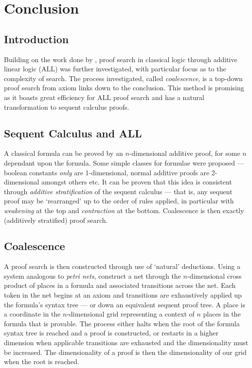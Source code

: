 \chapter{Conclusion}
    
        
    \section*{Introduction}
        Building on the work done by \citet{petri-nets}, proof search in classical logic through additive linear logic (ALL) was further investigated, with particular focus as to the complexity of search.
        The process investigated, called \textit{coalescence}, is a top-down proof search from axiom links down to the conclusion.
        This method is promising as it boasts great efficiency for ALL proof search and has a natural transformation to sequent calculus proofs.

    \section*{Sequent Calculus and ALL}
        A classical formula can be proved by an $n$-dimensional additive proof, for some $n$ dependant upon the formula.
        Some simple classes for formulae were proposed --- boolean constants \textit{only} are 1-dimensional, normal additive proofs are 2-dimensional amongst others etc.
        It can be proven that this idea is consistent through \textit{additive stratification} of the sequent calculus --- that is, any sequent proof may be `rearranged' up to the order of rules applied, in particular with \textit{weakening} at the top and \textit{contraction} at the bottom.
        Coalescence is then exactly (additively stratified) proof search.

    \section*{Coalescence}
        A proof search is then constructed through use of `natural' deductions.
        Using a system analogous to \textit{petri nets}, construct a net through the $n$-dimensional cross product of places in a formula and associated transitions across the net.
        Each token in the net begins at an axiom and transitions are exhaustively applied up the formula's syntax tree --- or down an equivalent sequent proof tree.
        A place is a coordinate in the $n$-dimensional grid representing a context of $n$ places in the formula that is provable.
        The process either halts when the root of the formula syntax tree is reached and a proof is constructed, or restarts in a higher dimension when applicable transitions are exhausted and the dimensionality must be increased.
        The dimensionality of a proof is then the dimensionality of our grid when the root is reached.

